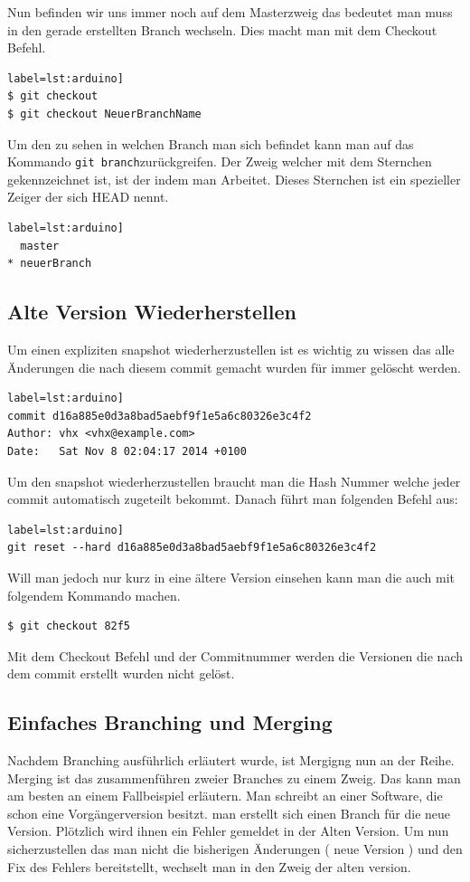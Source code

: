 \documentclass[12pt,a4paper,bibliography=totocnumbered,listof=totocnumbered]{scrartcl}
\begin{document}
Nun befinden wir uns immer noch auf dem Masterzweig das bedeutet man muss in den gerade erstellten Branch wechseln.
Dies macht man mit dem Checkout Befehl.
\begin{lstlisting}[caption=Branch Befehl] label=lst:arduino]
$ git checkout 
$ git checkout NeuerBranchName
\end{lstlisting}
Um den zu sehen in welchen Branch man sich befindet kann man auf das Kommando \lstinline|git branch|zurückgreifen. Der Zweig welcher mit dem Sternchen gekennzeichnet ist, ist der indem man Arbeitet. Dieses Sternchen ist ein spezieller Zeiger der sich HEAD nennt. 
\begin{lstlisting}[caption=Aktuellen Branch prüfen] label=lst:arduino]
  master
* neuerBranch
\end{lstlisting}

\subsection{Alte Version Wiederherstellen}
Um einen expliziten snapshot wiederherzustellen ist es wichtig zu wissen das alle Änderungen die nach diesem commit gemacht wurden für immer gelöscht werden. 
\begin{lstlisting}[caption=git log Befehl] label=lst:arduino]
commit d16a885e0d3a8bad5aebf9f1e5a6c80326e3c4f2
Author: vhx <vhx@example.com>
Date:   Sat Nov 8 02:04:17 2014 +0100
\end{lstlisting}
Um den snapshot wiederherzustellen braucht man die Hash Nummer welche jeder commit automatisch zugeteilt bekommt.
Danach führt man  folgenden Befehl aus:
\begin{lstlisting}[caption=snapshot wiederherstellen (wird gelöst)] label=lst:arduino]
git reset --hard d16a885e0d3a8bad5aebf9f1e5a6c80326e3c4f2
\end{lstlisting}

Will man jedoch nur kurz in eine ältere Version einsehen kann man die auch mit folgendem Kommando machen.
\begin{lstlisting}[caption=snapshot wiederherstellen (wird nicht gelöscht)]
$ git checkout 82f5
\end{lstlisting}
Mit dem Checkout Befehl und der Commitnummer werden die Versionen die nach dem commit erstellt wurden nicht gelöst.  
	
\subsection{Einfaches Branching und Merging}
Nachdem Branching ausführlich erläutert wurde, ist Mergigng  nun an der Reihe. Merging ist das zusammenführen zweier Branches zu einem Zweig.
Das kann man am besten an einem Fallbeispiel erläutern. 
Man schreibt an einer Software, die schon eine Vorgängerversion besitzt. 
man erstellt sich einen Branch für die neue Version. 
Plötzlich wird ihnen ein Fehler gemeldet in der Alten Version. Um nun sicherzustellen das man nicht die bisherigen Änderungen ( neue Version ) und den Fix des Fehlers bereitstellt, wechselt man in den Zweig der alten version. 
\end{document}
